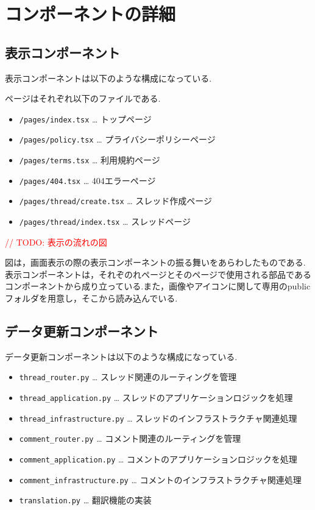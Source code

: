 \documentclass[b5paper,12pt,dvipdfmx]{jsreport}
\newcommand{\red}[1]{\textcolor{red}{#1}}
\begin{document}
\section{コンポーネントの詳細}


\subsection*{表示コンポーネント}

表示コンポーネントは以下のような構成になっている.

ページはそれぞれ以下のファイルである.

\begin{itemize}
    \item \texttt{/pages/index.tsx} … トップページ
    \item \texttt{/pages/policy.tsx} … プライバシーポリシーページ
    \item \texttt{/pages/terms.tsx} … 利用規約ページ
    \item \texttt{/pages/404.tsx} … 404エラーページ
    \item \texttt{/pages/thread/create.tsx} … スレッド作成ページ
    \item \texttt{/pages/thread/index.tsx} … スレッドページ
\end{itemize}

\red{// TODO: 表示の流れの図}

図は，画面表示の際の表示コンポーネントの振る舞いをあらわしたものである.表示コンポーネントは，それぞのれページとそのページで使用される部品であるコンポーネントから成り立っている.また，画像やアイコンに関して専用のpublicフォルダを用意し，そこから読み込んでいる.

\subsection*{データ更新コンポーネント}

データ更新コンポーネントは以下のような構成になっている.

\begin{itemize}
    \item \texttt{thread\_router.py} … スレッド関連のルーティングを管理
    \item \texttt{thread\_application.py} … スレッドのアプリケーションロジックを処理
    \item \texttt{thread\_infrastructure.py} … スレッドのインフラストラクチャ関連処理
    \item \texttt{comment\_router.py} … コメント関連のルーティングを管理
    \item \texttt{comment\_application.py} … コメントのアプリケーションロジックを処理
    \item \texttt{comment\_infrastructure.py} … コメントのインフラストラクチャ関連処理
    \item \texttt{translation.py} … 翻訳機能の実装
\end{itemize}
\end{document}
